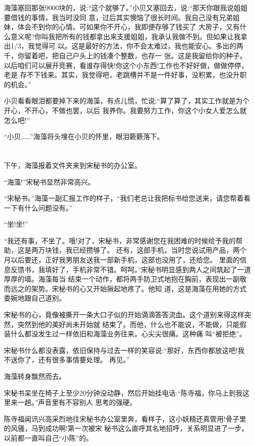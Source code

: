 \documentclass[11pt,a4paper,onecolumn]{article}
\begin{document}
海藻塞回那张9000块的，说:``这个就够了。''小贝又塞回去，说:``那天你跟我说姐姐要借钱的事情，我当时没同
意，过后其实懊恼了很长时间。我自己没有兄弟姐妹，体会不到你的心情。可如果你不开心，我即便存够了钱买了
大房子，又有什么意义呢?你叫我把所有的钱都拿出来支援姐姐，我承认我做不到。但如果让我拿出1/3，我觉得可
以。这是最好的方法，你不会太难过，我也能安心。多出的两千，你留着吧，把自己户头上的钱凑个整数，也存一
张。这是我留给你的种子。以后咱们可以展开竞赛，看谁存得快!你这个小东西!工作也不好好做，做做停停，老是
存不下钱来。其实，我觉得吧，老跳槽并不是一件好事，没积累，也没升职的机会。''

小贝看看眼泪都要掉下来的海藻，有点儿慌，忙说:``算了算了，其实工作就是为个开心，不开心，不做也罢，以后
我养你。我要努力工作，你这个小女人爱怎么就怎么吧!''

``小贝……''海藻将头埋在小贝的怀里，眼泪簌簌落下。

\section[\thesection]{}

下午，海藻报着文件夹来到宋秘书的办公室。

``海藻!''宋秘书显然非常高兴。

``宋秘书。''海藻一副汇报工作的样子，``我们老总让我把标书给您送来，请您帮着看一下有什么问题没有。''

``坐!坐!''

``我还有事，不坐了。哦!对了，宋秘书，非常感谢您在我困难的时候给予我的帮助，这是两万块钱，我已经攒够了。
还有，这部手机，当时您说试用产品，两个月以后要还，正好我男朋友送我一部新手机，这部也没用了，还给您。
里面的信息反馈书，我填好了，手机非常不错。呵呵。''宋秘书明显感到两人之间筑起了一道厚厚的墙。海藻每当
结束一个动作，都将两手防卫式地抱在胸前，表现出一副敬而远之的架势。宋秘书的心又开始揪起地疼了。他知
道，这是海藻在用她的方式委婉地跟自己道别。

宋秘书的心，竟像被撕开一条大口子似的开始滴滴答答流血。这个道别来得这样突然，突然到他的美好尚未开始就
结束了。而他，什么也不能说，不能做，只能假装什么都没发生过一样依旧和海藻业务往来。心尖尖很痛。这种痛
叫``被拒绝''。

宋秘书什么都没表露，依旧保持与过去一样的笑容说:``那好，东西你都放这吧!我不送你了，还有很多事情要处理。
再见。''

海藻转身飘然而去。

宋秘书呆坐在椅子上至少20分钟没动静，然后开始挂电话:``陈寺福，你马上到我这里来一趟。''声音里有不容别人
思考的强硬。

陈寺福闻讯兴高采烈地往宋秘书办公室里奔，看样子，这小妖精还真管用!骨子里的风骚，马到成功啊!第一次被宋
秘书这么直呼其名地招呼，关系明显进了一步。以前都一直叫自己``小陈''的。
\end{document}
